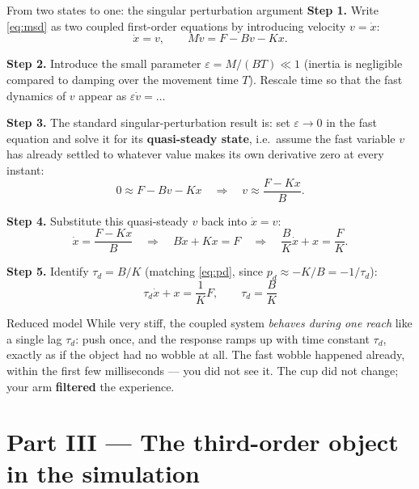 \documentclass[11pt,a4paper]{article}
\begin{document}
\begin{stepbox}{From two states to one: the singular perturbation argument}
\textbf{Step 1.} Write \eqref{eq:msd} as two coupled first-order equations by
introducing velocity $v=\dot x$:
\[
\dot x = v, \qquad M\dot v = F - Bv - Kx.
\]

\textbf{Step 2.} Introduce the small parameter $\varepsilon=M/(BT)\ll1$
(inertia is negligible compared to damping over the movement time $T$). Rescale
time so that the fast dynamics of $v$ appear as $\varepsilon \dot v = \ldots$

\textbf{Step 3.} The standard singular-perturbation result is: set
$\varepsilon\to0$ in the fast equation and solve it for its
\textbf{quasi-steady state}, i.e.\ assume the fast variable $v$ has already
settled to whatever value makes its own derivative zero at every instant:
\[
0 \approx F - Bv - Kx \quad\Longrightarrow\quad v \approx \frac{F-Kx}{B}.
\]

\textbf{Step 4.} Substitute this quasi-steady $v$ back into $\dot x=v$:
\[
\dot x = \frac{F-Kx}{B} \quad\Longrightarrow\quad B\dot x + Kx = F
\quad\Longrightarrow\quad \frac{B}{K}\dot x + x = \frac{F}{K}.
\]

\textbf{Step 5.} Identify $\tau_d=B/K$ (matching \eqref{eq:pd}, since
$p_d\approx-K/B=-1/\tau_d$):
\begin{equation}
\boxed{\;\tau_d \dot x + x = \frac{1}{K}F,
\qquad \tau_d = \frac{B}{K}\;}
\label{eq:reduced}
\end{equation}
\end{stepbox}

\begin{examplebox}{Reduced model}
While very stiff, the coupled system \emph{behaves during one reach} like a
single lag $\tau_d$: push once, and the response ramps up with time constant
$\tau_d$, exactly as if the object had no wobble at all. The fast wobble
happened already, within the first few milliseconds --- you did not see it.
The cup did not change; your arm \textbf{filtered} the experience.
\end{examplebox}

\section{Part III --- The third-order object in the simulation}
\label{sec:plant}
\end{document}
